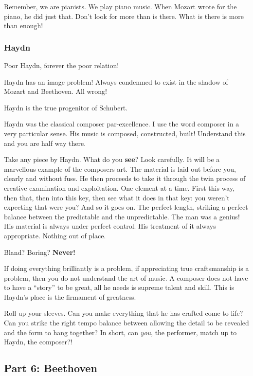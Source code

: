 \documentclass{article}
\begin{document}
Remember, we are pianists.
We play piano music.
When Mozart wrote for the piano, he did just that.
Don't look for more than is there.
What is there is more than enough!

\subsubsection{Haydn}

Poor Haydn, forever the poor relation!

Haydn has an image problem!
Always condemned to exist in the shadow of Mozart and Beethoven.
All wrong!

Haydn is the true progenitor of Schubert.

Haydn was the classical composer par-excellence.
I use the word composer in a very particular sense.
His music is composed, constructed, built!
Understand this and you are half way there.

Take any piece by Haydn.
What do you \textbf{see}?
Look carefully.
It will be a marvellous example of the composers art.
The material is laid out before you, clearly and without fuss.
He then proceeds to take it through the twin process of creative examination and exploitation.
One element at a time.
First this way, then that, then into this key, then see what it does in that key: you weren't expecting that were you?
And so it goes on.
The perfect length, striking a perfect balance between the predictable and the unpredictable.
The man was a genius!
His material is always under perfect control.
His treatment of it always appropriate.
Nothing out of place.

Bland?
Boring?
\textbf{Never!}

If doing everything brilliantly is a problem, if appreciating true craftsmanship is a problem, then you do not understand the art of music.
A composer does not have to have a ``story'' to be great, all he needs is supreme talent and skill.
This is Haydn's place is the firmament of greatness.

Roll up your sleeves.
Can you make everything that he has crafted come to life?
Can you strike the right tempo balance between allowing the detail to be revealed and the form to hang together?
In short, can \emph{you}, the performer, match up to Haydn, the composer?!

\subsection{Part 6: Beethoven}
\end{document}
